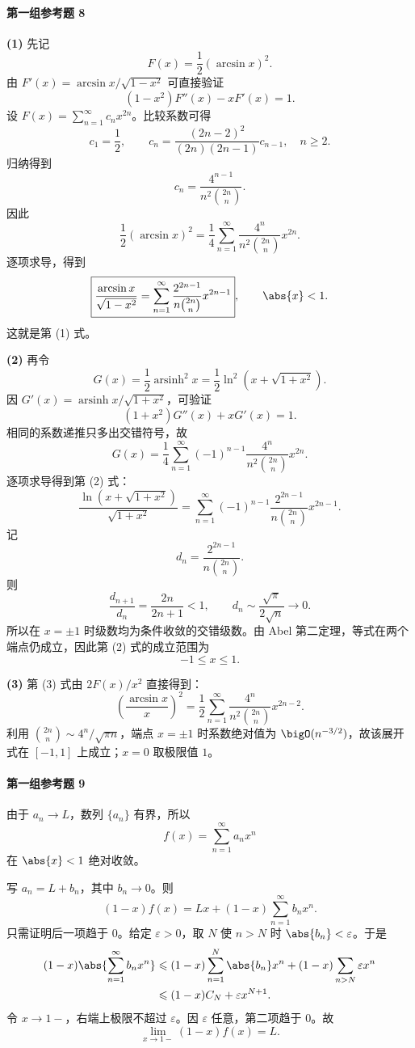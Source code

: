 \paragraph{第一组参考题 8}
\begin{xsolution}
\textbf{(1)} 先记
\[
  F(x)=\frac12(\arcsin x)^2.
\]
由 $F'(x)=\arcsin x/\sqrt{1-x^2}$ 可直接验证
\[
  (1-x^2)F''(x)-xF'(x)=1.
\]
设 $F(x)=\sum_{n=1}^{\infty}c_nx^{2n}$。比较系数可得
\[
  c_1=\frac12,
  \qquad
  c_n=\frac{(2n-2)^2}{(2n)(2n-1)}c_{n-1},\quad n\geqslant2.
\]
归纳得到
\[
  c_n=\frac{4^{n-1}}{n^2{2n\choose n}}.
\]
因此
\[
  \frac12(\arcsin x)^2
  =\frac14\sum_{n=1}^{\infty}
  \frac{4^n}{n^2{2n\choose n}}x^{2n}.
\]
逐项求导，得到
\[
  \boxed{
  \frac{\arcsin x}{\sqrt{1-x^2}}
  =\sum_{n=1}^{\infty}
  \frac{2^{2n-1}}{n{2n\choose n}}x^{2n-1}},
  \qquad \abs{x}<1.
\]
这就是第 (1) 式。

\textbf{(2)} 再令
\[
  G(x)=\frac12\operatorname{arsinh}^2x
  =\frac12\ln^2(x+\sqrt{1+x^2}).
\]
因 $G'(x)=\operatorname{arsinh}x/\sqrt{1+x^2}$，可验证
\[
  (1+x^2)G''(x)+xG'(x)=1.
\]
相同的系数递推只多出交错符号，故
\[
  G(x)=\frac14\sum_{n=1}^{\infty}
  (-1)^{n-1}\frac{4^n}{n^2{2n\choose n}}x^{2n}.
\]
逐项求导得到第 (2) 式：
\[
  \boxed{
  \frac{\ln(x+\sqrt{1+x^2})}{\sqrt{1+x^2}}
  =\sum_{n=1}^{\infty}
  (-1)^{n-1}\frac{2^{2n-1}}{n{2n\choose n}}x^{2n-1}}.
\]
记
\[
  d_n=\frac{2^{2n-1}}{n{2n\choose n}}.
\]
则
\[
  \frac{d_{n+1}}{d_n}=\frac{2n}{2n+1}<1,
  \qquad d_n\sim\frac{\sqrt\pi}{2\sqrt n}\to0.
\]
所以在 $x=\pm1$ 时级数均为条件收敛的交错级数。由 Abel 第二定理，等式在两个端点仍成立，因此第 (2) 式的成立范围为
\[
  \boxed{-1\leqslant x\leqslant1}.
\]

\textbf{(3)} 第 (3) 式由 $2F(x)/x^2$ 直接得到：
\[
  \boxed{
  \left(\frac{\arcsin x}{x}\right)^2
  =\frac12\sum_{n=1}^{\infty}
  \frac{4^n}{n^2{2n\choose n}}x^{2n-2}}.
\]
利用 ${2n\choose n}\sim4^n/\sqrt{\pi n}$，端点 $x=\pm1$ 时系数绝对值为 $\bigO(n^{-3/2})$，故该展开式在 $[-1,1]$ 上成立；$x=0$ 取极限值 $1$。
\end{xsolution}

\paragraph{第一组参考题 9}
\begin{xsolution}
由于 $a_n\to L$，数列 $\{a_n\}$ 有界，所以
\[
  f(x)=\sum_{n=1}^{\infty}a_nx^n
\]
在 $\abs{x}<1$ 绝对收敛。

写 $a_n=L+b_n$，其中 $b_n\to0$。则
\[
  (1-x)f(x)=Lx+(1-x)\sum_{n=1}^{\infty}b_nx^n.
\]
只需证明后一项趋于 $0$。给定 $\varepsilon>0$，取 $N$ 使 $n>N$ 时 $\abs{b_n}<\varepsilon$。于是
\[
\begin{aligned}
  (1-x)\abs{\sum_{n=1}^{\infty}b_nx^n}
  &\leqslant(1-x)\sum_{n=1}^{N}\abs{b_n}x^n
  +(1-x)\sum_{n>N}\varepsilon x^n\\
  &\leqslant(1-x)C_N+\varepsilon x^{N+1}.
\end{aligned}
\]
令 $x\to1-$，右端上极限不超过 $\varepsilon$。因 $\varepsilon$ 任意，第二项趋于 $0$。故
\[
  \boxed{\lim_{x\to1-}(1-x)f(x)=L}.
\]
\end{xsolution}

